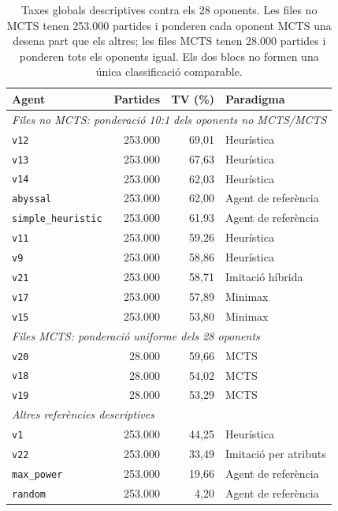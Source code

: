 \begin{table}[htbp]
\centering
\caption{Taxes globals descriptives contra els 28 oponents. Les files no MCTS tenen 253.000 partides i ponderen cada oponent MCTS una desena part que els altres; les files MCTS tenen 28.000 partides i ponderen tots els oponents igual. Els dos blocs no formen una única classificació comparable.}
\label{tab:overall_wr}
\small
\begin{tabular}{lrrl}
\toprule
\textbf{Agent} & \textbf{Partides} & \textbf{TV (\%)} & \textbf{Paradigma} \\
\midrule
\multicolumn{4}{l}{\textit{Files no MCTS: ponderació 10:1 dels oponents no MCTS/MCTS}} \\
\texttt{v12}               & 253.000 & 69,01 & Heurística \\
\texttt{v13}               & 253.000 & 67,63 & Heurística \\
\texttt{v14}               & 253.000 & 62,03 & Heurística \\
\texttt{abyssal}           & 253.000 & 62,00 & Agent de referència \\
\texttt{simple\_heuristic} & 253.000 & 61,93 & Agent de referència \\
\texttt{v11}               & 253.000 & 59,26 & Heurística \\
\texttt{v9}                & 253.000 & 58,86 & Heurística \\
\texttt{v21}               & 253.000 & 58,71 & Imitació híbrida \\
\texttt{v17}               & 253.000 & 57,89 & Minimax \\
\texttt{v15}               & 253.000 & 53,80 & Minimax \\
\midrule
\multicolumn{4}{l}{\textit{Files MCTS: ponderació uniforme dels 28 oponents}} \\
\texttt{v20}               &  28.000 & 59,66 & MCTS \\
\texttt{v18}               &  28.000 & 54,02 & MCTS \\
\texttt{v19}               &  28.000 & 53,29 & MCTS \\
\midrule
\multicolumn{4}{l}{\textit{Altres referències descriptives}} \\
\texttt{v1}                & 253.000 & 44,25 & Heurística \\
\texttt{v22}               & 253.000 & 33,49 & Imitació per atributs \\
\texttt{max\_power}        & 253.000 & 19,66 & Agent de referència \\
\texttt{random}            & 253.000 &  4,20 & Agent de referència \\
\bottomrule
\end{tabular}
\end{table}
